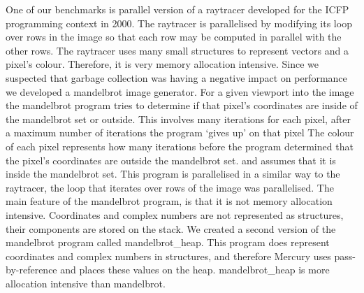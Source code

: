 One of our benchmarks is parallel version of a raytracer developed for the
ICFP programming context in 2000.
The raytracer is parallelised by modifying its loop over rows in the image
so that each row may be computed in parallel with the other rows.
The raytracer uses many small structures to represent vectors and a pixel's
colour.
Therefore,
it is very memory allocation intensive.
Since we suspected that garbage collection was having a negative impact on
performance we developed a mandelbrot image generator.
For a given viewport into the image the mandelbrot program
tries to determine if that pixel's coordinates are inside of the mandelbrot
set or outside.
This involves many iterations for each pixel,
after a maximum number of iterations the program `gives up' on that pixel
The colour of each pixel represents how many iterations before the program
determined that the pixel's coordinates are outside the mandelbrot set.
and assumes that it is inside the mandelbrot set.
This program is parallelised in a similar way to the raytracer,
the loop that iterates over rows of the image was parallelised.
The main feature of the mandelbrot program,
is that it is not memory allocation intensive.
Coordinates and complex numbers are not represented as structures,
their components are stored on the stack.
We created a second version of the mandelbrot program called
mandelbrot\_heap.
This program does represent coordinates and complex numbers in structures,
and therefore Mercury uses pass-by-reference and places these values on the
heap.
mandelbrot\_heap is more allocation intensive than mandelbrot.


